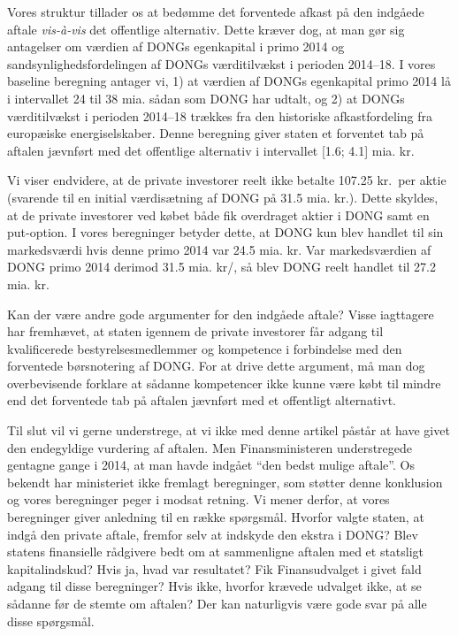 \documentclass{article}
\begin{document}
Vores struktur tillader os at bedømme det forventede afkast på den indgåede aftale \emph{vis-\`{a}-vis} det offentlige alternativ. Dette kræver dog, at man gør sig antagelser om værdien af DONGs egenkapital i primo 2014 og sandsynlighedsfordelingen af DONGs  værditilvækst i perioden 2014--18. I vores baseline beregning antager vi, 1) at værdien af DONGs egenkapital primo 2014 lå i intervallet 24 til 38 mia. sådan som DONG har udtalt, og 2) at DONGs  værditilvækst i perioden 2014--18 trækkes fra den historiske afkastfordeling fra europæiske energiselskaber. Denne beregning giver staten et forventet tab på aftalen jævnført med det offentlige alternativ i intervallet [1.6; 4.1] mia. kr. 

Vi viser endvidere, at de private investorer reelt ikke betalte 107.25 kr.\ per aktie (svarende til en initial værdisætning af DONG på 31.5 mia. kr.). Dette skyldes, at de private investorer ved købet både fik overdraget  aktier i DONG samt en put-option. I vores beregninger betyder dette, at DONG kun blev handlet til sin markedsværdi hvis denne primo 2014 var 24.5 mia. kr. Var markedsværdien af DONG primo 2014 derimod 31.5 mia. kr/, så blev DONG reelt handlet til 27.2 mia. kr.


Kan der være andre gode argumenter for den indgåede aftale? Visse iagttagere har fremhævet, at staten igennem de private investorer får adgang til kvalificerede bestyrelsesmedlemmer og kompetence i forbindelse med den forventede børsnotering af DONG. For at drive dette argument, må man dog overbevisende forklare at sådanne kompetencer ikke kunne være købt til mindre end  det forventede tab på aftalen jævnført med et offentligt alternativt. %

Til slut vil vi gerne understrege, at vi ikke med denne artikel påstår at have givet den endegyldige vurdering af aftalen. Men Finansministeren understregede gentagne gange i 2014, at man havde indgået \enquote{den bedst mulige aftale}. 
Os bekendt har ministeriet ikke fremlagt beregninger, som støtter denne konklusion og vores beregninger peger i modsat retning. Vi mener derfor, at vores beregninger giver anledning til en række spørgsmål. Hvorfor valgte staten, at indgå den private aftale, fremfor selv at indskyde den ekstra i DONG? Blev statens finansielle rådgivere bedt om at sammenligne aftalen med et statsligt kapitalindskud? Hvis ja, hvad var resultatet? Fik Finansudvalget i givet fald adgang til disse beregninger? Hvis ikke, hvorfor krævede udvalget ikke, at se sådanne før de stemte om aftalen? Der kan naturligvis være gode svar på alle disse spørgsmål. %
\end{document}
